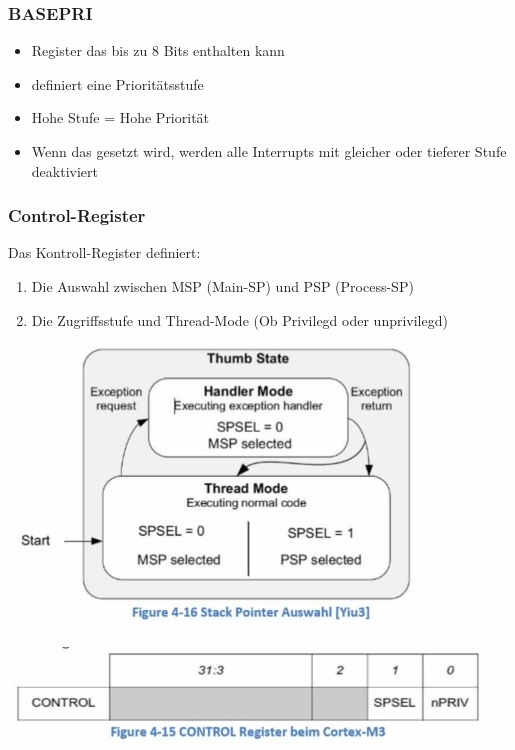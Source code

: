 \subsubsection{BASEPRI}
\begin{itemize}
    \item Register das bis zu 8 Bits enthalten kann
    \item definiert eine Prioritätsstufe
    \item Hohe Stufe = Hohe Priorität
    \item Wenn das gesetzt wird, werden alle Interrupts mit gleicher oder tieferer Stufe deaktiviert
\end{itemize}

\subsubsection{Control-Register}
Das Kontroll-Register definiert:
\begin{enumerate}
    \item Die Auswahl zwischen MSP (Main-SP) und PSP (Process-SP)
    \item Die Zugriffsstufe und Thread-Mode
    \subitem (Ob Privilegd oder unprivilegd)
\end{enumerate}
\begin{multicols}{2}
    \includegraphics[width=\linewidth]{images/StackPointerAuswahl}
    
    \includegraphics[width=\linewidth]{images/controlRegister}
\end{multicols}